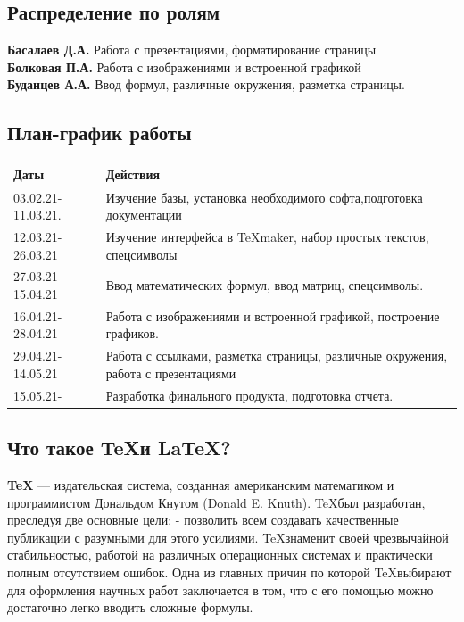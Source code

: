 \documentclass[14pt, a4paper]{extarticle}
\begin{document}
\subsection{Распределение по ролям}
\textbf{Басалаев Д.А.} Работа с презентациями, форматирование страницы\\
\textbf{Болковая П.А.} Работа с изображениями и встроенной графикой\\
\textbf{Буданцев А.А.} Ввод формул, различные окружения, разметка страницы.
\subsection{План-график работы}
\begin{tabular}{| l| p{13cm}|}
\hline {\bfseries \large Даты} & {\bfseries \large Действия}\\ \hline
03.02.21-11.03.21. & Изучение базы, установка необходимого софта,подготовка документации\\ \hline
12.03.21-26.03.21 & Изучение интерфейса в \TeX maker, набор простых текстов, спецсимволы \\ \hline
27.03.21-15.04.21 & Ввод математических формул, ввод матриц, спецсимволы.  \\ \hline
16.04.21-28.04.21 & Работа с изображениями и встроенной графикой, построение графиков. \\ \hline 
29.04.21-14.05.21 & Работа с ссылками, разметка страницы, различные окружения, работа с презентациями \\ \hline
15.05.21- & Разработка финального продукта, подготовка отчета. \\ \hline
\end{tabular}
\subsection{Что такое \TeX и \LaTeX ?}
\textbf{\TeX} — издательская система, созданная американским математиком и программистом Дональдом Кнутом (Donald E. Knuth). \TeX был разработан, преследуя две основные цели: - позволить всем создавать качественные публикации с разумными для этого усилиями. \TeX знаменит своей чрезвычайной стабильностью, работой на различных операционных системах и практически полным отсутствием ошибок. Одна из главных причин по которой \TeX выбирают для оформления научных работ заключается в том, что с его помощью можно достаточно легко вводить сложные формулы.\\
\end{document}
